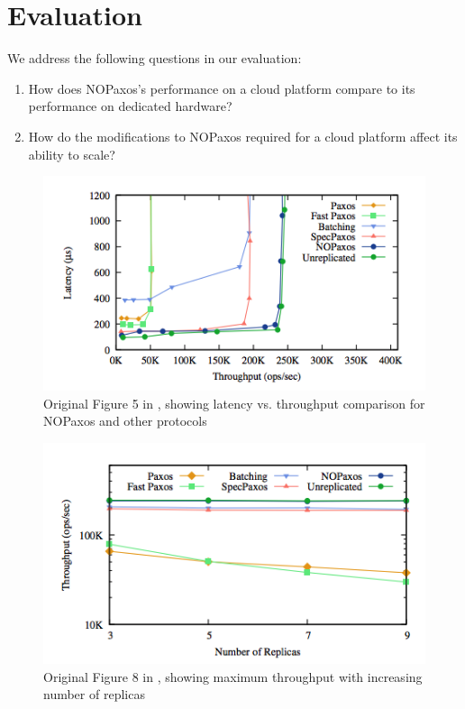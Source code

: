 \section{Evaluation}

We address the following questions in our evaluation:
\begin{enumerate}
\item How does NOPaxos's performance on a cloud platform compare to its performance on dedicated hardware?
\item How do the modifications to NOPaxos required for a cloud platform affect its ability to scale?
\end{enumerate}

\begin{figure}[tp]
\centering
\includegraphics[scale=0.5]{figures/figure_5.png}
\caption{Original Figure 5 in \cite{nopaxos}, showing latency vs. throughput comparison for NOPaxos and other protocols}
\end{figure}

\begin{figure}[tp]
\centering
\includegraphics[scale=0.5]{figures/figure_8.png}
\caption{Original Figure 8 in \cite{nopaxos}, showing maximum throughput with increasing number of replicas}
\end{figure}

